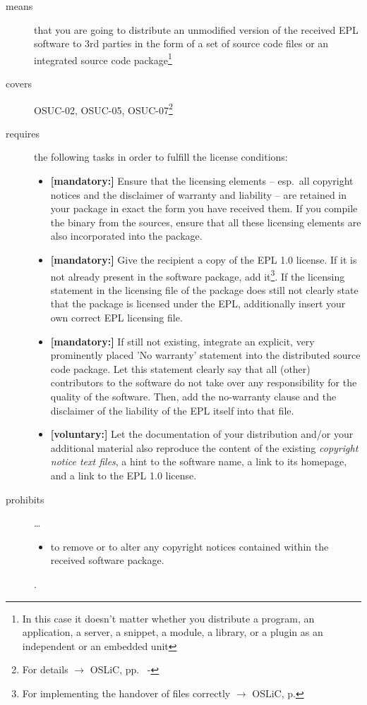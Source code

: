 \begin{description}

\item[means] that you are going to distribute an unmodified version of the
received EPL software to 3rd parties in the form of a set of source code files or
an integrated source code package\footnote{In this case it doesn't matter
whether you  distribute a program, an application, a server, a snippet, a
module, a library, or a plugin as an independent or an embedded unit}

\item[covers] OSUC-02, OSUC-05, OSUC-07\footnote{For details $\rightarrow$ OSLiC, pp.\ 
\pageref{OSUC-02-DEF} - \pageref{OSUC-07-DEF}}

\item[requires] the following tasks in order to fulfill the license conditions:
\begin{itemize}
  
  \item \textbf{[mandatory:]} Ensure that the licensing elements -- esp.\ all
  copyright notices and the disclaimer of warranty and liability -- are retained
  in your package in exact the form you have received them. If you compile the
  binary from the sources, ensure that all these licensing elements are also
  incorporated into the package. 
  
  \item \textbf{[mandatory:]} Give the recipient a copy of the EPL 1.0 license.
  If it is not already present in the software package, add it\footnote{For
  implementing the handover of files correctly $\rightarrow$ OSLiC, p.
  \pageref{DistributingFilesHint}}. If the licensing statement in the licensing
  file of the package does still not clearly state that the package is licensed
  under the EPL, additionally insert your own correct EPL licensing file.
  
  \item \textbf{[mandatory:]} If still not existing, integrate an explicit, very
  prominently placed 'No warranty' statement into the distributed source code
  package. Let this statement clearly say that all (other) contributors to the
  software do not take over any responsibility for the quality of the software.
  Then, add the no-warranty clause and the disclaimer of the liability of the
  EPL itself into that file.
  
  \item \textbf{[voluntary:]} Let the documentation of your distribution and/or
  your additional material also reproduce the content of the existing
  \emph{copyright notice text files}, a hint to the software name, a link to its
  homepage, and a link to the EPL 1.0 license.
\end{itemize}

\item[prohibits] \ldots
\begin{itemize}
  \item to remove or to alter any copyright notices contained within the
  received software package.
\end{itemize}.

\end{description}


